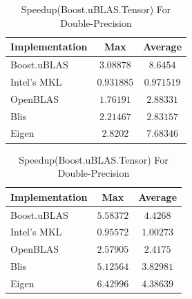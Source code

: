 \begin{table}[ht]
    \centering
    \caption{Speedup(Boost.uBLAS.Tensor) For Single-Precision}
    \begin{tabular}{|l|c|c|}
        \hline
        \textbf{Implementation} & \textbf{Max} & \textbf{Average}\\
        \hline
        Boost.uBLAS         & $3.08878$ & $8.6454$ \\
        \hline
        Intel's MKL         & $0.931885$ & $0.971519$ \\
        \hline
        OpenBLAS            & $1.76191$ & $2.88331$ \\
        \hline
        Blis                & $2.21467$ & $2.83157$ \\
        \hline
        Eigen               & $2.8202$ & $7.68346$ \\
        \hline
    \end{tabular}

    \vspace*{1 cm}

    \centering
    \caption{Speedup(Boost.uBLAS.Tensor) For Double-Precision}
    \begin{tabular}{|l|c|c|}
        \hline
        \textbf{Implementation} & \textbf{Max} & \textbf{Average}\\
        \hline
        Boost.uBLAS         & $5.58372$ & $4.4268$ \\
        \hline
        Intel's MKL         & $0.95572$ & $1.00273$ \\
        \hline
        OpenBLAS            & $2.57905$ & $2.4175$ \\
        \hline
        Blis                & $5.12564$ & $3.82981$ \\
        \hline
        Eigen               & $6.42996$ & $4.38639$ \\
        \hline
    \end{tabular}
\end{table}
